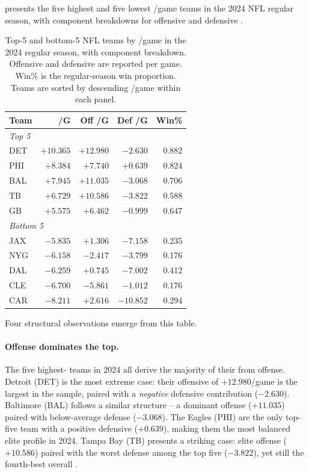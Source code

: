  presents the five highest and five lowest \gds{}/game
teams in the 2024 NFL regular season, with component breakdowns for offensive
and defensive \xvoa{}.

\begin{table}[htbp]
  \centering
  \caption{Top-5 and bottom-5 NFL teams by \gds{}/game in the 2024 regular
           season, with component breakdown. Offensive and defensive \xvoa{}
           are reported per game. Win\% is the regular-season win proportion.
           Teams are sorted by descending \gds{}/game within each panel.}
  \label{tab:gds-top-bottom}
  \begin{tabular}{lrrrr}
    \toprule
    \textbf{Team} & \textbf{\gds{}/G} & \textbf{Off \xvoa{}/G}
      & \textbf{Def \xvoa{}/G} & \textbf{Win\%} \\
    \midrule
    \multicolumn{5}{l}{\textit{Top 5}} \\[2pt]
    DET & $+10.365$ & $+12.980$ & $-2.630$ & 0.882 \\
    PHI & $+8.384$  & $+7.740$  & $+0.639$ & 0.824 \\
    BAL & $+7.945$  & $+11.035$ & $-3.068$ & 0.706 \\
    TB  & $+6.729$  & $+10.586$ & $-3.822$ & 0.588 \\
    GB  & $+5.575$  & $+6.462$  & $-0.999$ & 0.647 \\[6pt]
    \multicolumn{5}{l}{\textit{Bottom 5}} \\[2pt]
    JAX & $-5.835$  & $+1.306$  & $-7.158$  & 0.235 \\
    NYG & $-6.158$  & $-2.417$  & $-3.799$  & 0.176 \\
    DAL & $-6.259$  & $+0.745$  & $-7.002$  & 0.412 \\
    CLE & $-6.700$  & $-5.861$  & $-1.012$  & 0.176 \\
    CAR & $-8.211$  & $+2.616$  & $-10.852$ & 0.294 \\
    \bottomrule
  \end{tabular}
\end{table}

Four structural observations emerge from this table.

\paragraph{Offense dominates the top.}
The five highest-\gds{} teams in 2024 all derive the majority of their
\gds{} from offense. Detroit (DET) is the most extreme case: their offensive
\xvoa{} of $+12.980$/game is the largest in the sample, paired with a
\emph{negative} defensive contribution ($-2.630$). Baltimore (BAL) follows a
similar structure -- a dominant offense ($+11.035$) paired with below-average
defense ($-3.068$). The Eagles (PHI) are the only top-five team with a
positive defensive \xvoa{} ($+0.639$), making them the most balanced elite
profile in 2024. Tampa Bay (TB) presents a striking case: elite offense
($+10.586$) paired with the worst defense among the top five ($-3.822$), yet
still the fourth-best overall \gds{}.

